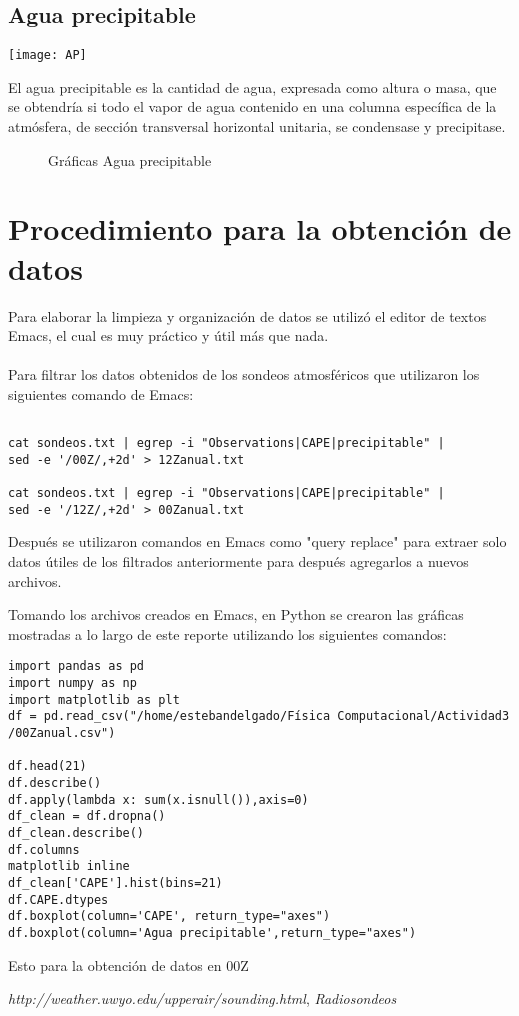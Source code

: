 \documentclass[12pt]{article}
\begin{document}
\subsection{Agua precipitable}
\begin{center}
\texttt{[image: AP]}
\end{center}
El agua precipitable es la cantidad de agua, expresada como altura o masa, que se obtendría si todo el vapor de agua contenido en una columna específica de la atmósfera, de sección transversal horizontal unitaria, se condensase y precipitase. \\

\begin{figure}[H]
 \centering
  \subfloat[00Z]{
   \label{00Z}
    \texttt{[image: AG1]}}
  \subfloat[12Z]{
   \label{12Z}
    \texttt{[image: AG2]}}
 \caption{Gráficas Agua precipitable}
 \label{f:animales}
\end{figure}

\section{Procedimiento para la obtención de datos}
Para elaborar la limpieza y organización de datos se utilizó el editor de textos Emacs, el cual es muy práctico y útil más que nada.\\
\\
Para filtrar los datos obtenidos de los sondeos atmosféricos que utilizaron los siguientes comando de Emacs:
\begin{verbatim}

cat sondeos.txt | egrep -i "Observations|CAPE|precipitable" |
sed -e '/00Z/,+2d' > 12Zanual.txt

cat sondeos.txt | egrep -i "Observations|CAPE|precipitable" |
sed -e '/12Z/,+2d' > 00Zanual.txt
\end{verbatim}
\vspace{0.5cm}
Después se utilizaron comandos en Emacs como "query replace" para extraer solo datos útiles de los filtrados anteriormente para después agregarlos a nuevos archivos.

\newpage
Tomando los archivos creados en Emacs, en Python se crearon las gráficas mostradas a lo largo de este reporte utilizando los siguientes comandos:

\begin{verbatim}
import pandas as pd
import numpy as np
import matplotlib as plt
df = pd.read_csv("/home/estebandelgado/Física Computacional/Actividad3
/00Zanual.csv")

df.head(21)
df.describe()
df.apply(lambda x: sum(x.isnull()),axis=0)
df_clean = df.dropna()
df_clean.describe()
df.columns
matplotlib inline
df_clean['CAPE'].hist(bins=21)
df.CAPE.dtypes
df.boxplot(column='CAPE', return_type="axes") 
df.boxplot(column='Agua precipitable',return_type="axes") 
\end{verbatim}
Esto para la obtención de datos en 00Z



\begin{thebibliography}{9}
 \textit{http://weather.uwyo.edu/upperair/sounding.html}, \textit{Radiosondeos}
\end{thebibliography}
\end{document}
